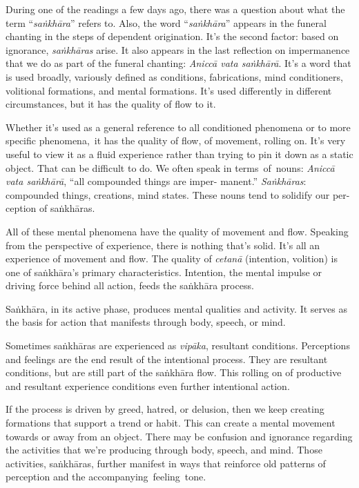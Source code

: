 During one of the readings a few days ago, there was a question about what the term ``\emph{saṅkhāra}'' refers to. Also, the word ``\emph{saṅkhāra}'' appears in the funeral chanting in the steps of dependent origination. It's the second factor: based on ignorance, \emph{saṅkhāras} arise. It also appears in the last reflection on impermanence that we do as part of the funeral chanting: \emph{Aniccā vata saṅkhārā}. It's a word that is used broadly, variously defined as conditions, fabrications, mind conditioners, volitional formations, and mental formations. It's used differently in different circumstances, but it has the quality of flow to it.

Whether it's used as a general reference to all conditioned phenomena or to more specific \mbox{phenomena, it} has the quality of flow, of movement, rolling on. It's very useful to view it as a fluid experience rather than trying to pin it down as a static object. That can be difficult to do. We often speak in \mbox{terms of nouns:} \emph{Aniccā vata saṅkhārā}, ``all compounded things are imper- \linebreak manent.'' \emph{Saṅkhāras}: compounded things, creations, mind states. These nouns tend to solidify our per- \linebreak ception of saṅkhāras.

All of these mental phenomena have the quality of movement and flow. Speaking from the perspective of experience, there is nothing that's solid. It's all an experience of movement and flow. The quality of \emph{cetanā} (intention, volition) is one of saṅkhāra's primary characteristics. Intention, the mental impulse or driving force behind all action, feeds the saṅkhāra process.

Saṅkhāra, in its active phase, produces mental qualities and activity. It serves as the basis for action that manifests through body, speech, or mind.

Sometimes saṅkhāras are experienced as \emph{vipāka}, resultant conditions. Perceptions and feelings are the end result of the intentional process. They are resultant conditions, but are still part of the saṅkhāra flow. This rolling on of productive and resultant experience conditions even further intentional action.

If the process is driven by greed, hatred, or delusion, then we keep creating formations that support a trend or habit. This can create a mental movement towards or away from an object. There may be confusion and ignorance regarding the activities that we're producing through body, speech, and mind. Those activities, saṅkhāras, further manifest in ways that reinforce old patterns of perception and the \mbox{accompanying feeling tone.}

